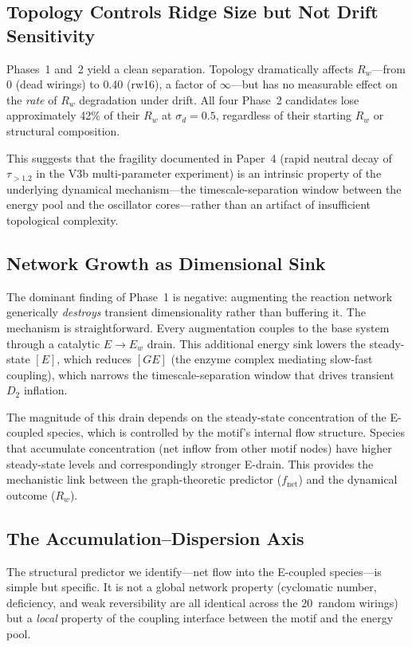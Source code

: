 \documentclass[twocolumn,showpacs,preprintnumbers,amsmath,amssymb,prd,floatfix]{revtex4-2}
\newcommand{\tauexp}{\tau_{>1.2}}
\newcommand{\Dtwo}{D_2}
\newcommand{\Rw}{R_w}
\renewcommand{\sd}{\sigma_d}
\begin{document}
\subsection{Topology Controls Ridge Size but Not Drift Sensitivity}

Phases~1 and~2 yield a clean separation. Topology dramatically affects $\Rw$---from 0 (dead wirings) to 0.40 (rw16), a factor of $\infty$---but has no measurable effect on the \textit{rate} of $\Rw$ degradation under drift. All four Phase~2 candidates lose approximately 42\% of their $\Rw$ at $\sd = 0.5$, regardless of their starting $\Rw$ or structural composition.

This suggests that the fragility documented in Paper~4 (rapid neutral decay of $\tauexp$ in the V3b multi-parameter experiment) is an intrinsic property of the underlying dynamical mechanism---the timescale-separation window between the energy pool and the oscillator cores---rather than an artifact of insufficient topological complexity.

\subsection{Network Growth as Dimensional Sink}

The dominant finding of Phase~1 is negative: augmenting the reaction network generically \textit{destroys} transient dimensionality rather than buffering it. The mechanism is straightforward. Every augmentation couples to the base system through a catalytic $E \to E_w$ drain. This additional energy sink lowers the steady-state $[E]$, which reduces $[GE]$ (the enzyme complex mediating slow-fast coupling), which narrows the timescale-separation window that drives transient $\Dtwo$ inflation.

The magnitude of this drain depends on the steady-state concentration of the E-coupled species, which is controlled by the motif's internal flow structure. Species that accumulate concentration (net inflow from other motif nodes) have higher steady-state levels and correspondingly stronger E-drain. This provides the mechanistic link between the graph-theoretic predictor ($f_\text{net}$) and the dynamical outcome ($\Rw$).

\subsection{The Accumulation--Dispersion Axis}

The structural predictor we identify---net flow into the E-coupled species---is simple but specific. It is not a global network property (cyclomatic number, deficiency, and weak reversibility are all identical across the 20~random wirings) but a \textit{local} property of the coupling interface between the motif and the energy pool.
\end{document}
